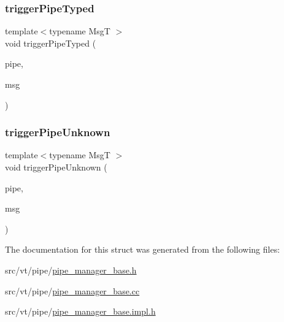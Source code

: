 \mbox{\label{structvt_1_1pipe_1_1_pipe_manager_base_a18038800a9665e59944db577325a3f76}} 
\subsubsection{\texorpdfstring{trigger\+Pipe\+Typed}{triggerPipeTyped}}
{\footnotesize\ttfamily template$<$typename MsgT $>$ \\
void trigger\+Pipe\+Typed (\begin{DoxyParamCaption}\item[{\hyperlink{namespacevt_ac9852acda74d1896f48f406cd72c7bd3}{Pipe\+Type} const \&}]{pipe,  }\item[{MsgT $\ast$}]{msg }\end{DoxyParamCaption})\hspace{0.3cm}{\ttfamily [friend]}}

\mbox{\label{structvt_1_1pipe_1_1_pipe_manager_base_af796769ead9441e58e20ee9d43b2a313}} 
\subsubsection{\texorpdfstring{trigger\+Pipe\+Unknown}{triggerPipeUnknown}}
{\footnotesize\ttfamily template$<$typename MsgT $>$ \\
void trigger\+Pipe\+Unknown (\begin{DoxyParamCaption}\item[{\hyperlink{namespacevt_ac9852acda74d1896f48f406cd72c7bd3}{Pipe\+Type} const \&}]{pipe,  }\item[{MsgT $\ast$}]{msg }\end{DoxyParamCaption})\hspace{0.3cm}{\ttfamily [friend]}}



The documentation for this struct was generated from the following files\+:\begin{DoxyCompactItemize}
\item 
src/vt/pipe/\hyperlink{pipe__manager__base_8h}{pipe\+\_\+manager\+\_\+base.\+h}\item 
src/vt/pipe/\hyperlink{pipe__manager__base_8cc}{pipe\+\_\+manager\+\_\+base.\+cc}\item 
src/vt/pipe/\hyperlink{pipe__manager__base_8impl_8h}{pipe\+\_\+manager\+\_\+base.\+impl.\+h}\end{DoxyCompactItemize}
